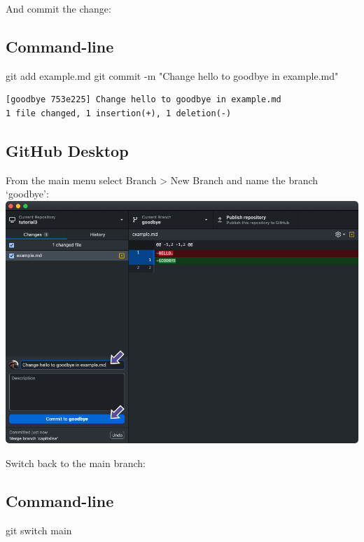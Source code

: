 \documentclass[
  letterpaper,
  DIV=11,
  numbers=noendperiod]{scrartcl}
\newenvironment{Shaded}{\begin{snugshade}}{\end{snugshade}}
\newcommand{\AttributeTok}[1]{\textcolor[rgb]{0.40,0.45,0.13}{#1}}
\newcommand{\FunctionTok}[1]{\textcolor[rgb]{0.28,0.35,0.67}{#1}}
\newcommand{\NormalTok}[1]{\textcolor[rgb]{0.00,0.23,0.31}{#1}}
\newcommand{\StringTok}[1]{\textcolor[rgb]{0.13,0.47,0.30}{#1}}
\begin{document}
And commit the change:

\subsection{Command-line}

\begin{Shaded}
\begin{Highlighting}[]
\FunctionTok{git}\NormalTok{ add example.md}
\FunctionTok{git}\NormalTok{ commit }\AttributeTok{{-}m} \StringTok{"Change hello to goodbye in example.md"}
\end{Highlighting}
\end{Shaded}

\begin{verbatim}
[goodbye 753e225] Change hello to goodbye in example.md
1 file changed, 1 insertion(+), 1 deletion(-)
\end{verbatim}

\subsection{GitHub Desktop}

From the main menu select Branch \textgreater{} New Branch and name the
branch `goodbye': \includegraphics{images/image59.png}

Switch back to the main branch:

\subsection{Command-line}

\begin{Shaded}
\begin{Highlighting}[]
\FunctionTok{git}\NormalTok{ switch main}
\end{Highlighting}
\end{Shaded}
\end{document}
